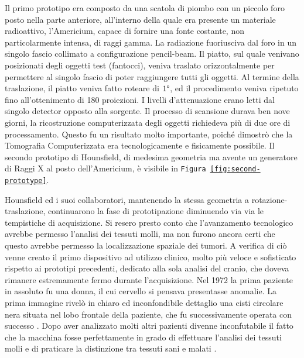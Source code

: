 \documentclass[a4paper,12pt, doubleside]{report}
\begin{document}
                    Il primo prototipo era composto da una scatola di piombo con un piccolo foro posto nella parte anteriore, all’interno della quale era presente un materiale radioattivo, l’Americium, capace di fornire una fonte costante, non particolarmente intensa, di raggi gamma. La radiazione fuoriusciva dal foro in un singolo fascio collimato a configurazione pencil-beam. Il piatto, sul quale venivano posizionati degli oggetti test (fantocci), veniva traslato orizzontalmente per permettere al singolo fascio di poter raggiungere tutti gli oggetti. Al termine della traslazione, il piatto veniva fatto roteare di $1\degree$, ed il procedimento veniva ripetuto fino all'ottenimento di 180 proiezioni. I livelli d'attenuazione erano letti dal singolo detector opposto alla sorgente. Il processo di scansione durava ben nove giorni, la ricostruzione computerizzata degli oggetti richiedeva più di due ore di processamento. Questo fu un risultato molto importante, poiché dimostrò che la Tomografia Computerizzata era tecnologicamente e fisicamente possibile. Il secondo prototipo di Hounsfield, di medesima geometria ma avente un generatore di Raggi X al posto dell'Americium, è visibile in \texttt{Figura \ref{fig:second-prototype}}.
                
                \bigskip
                \par
                    Hounsfield ed i suoi collaboratori, mantenendo la stessa geometria a rotazione-traslazione, continuarono la fase di prototipazione diminuendo via via le tempistiche di acquisizione. Si resero presto conto che l'avanzamento tecnologico avrebbe permesso l'analisi dei tessuti molli, ma non furono ancora certi che questo avrebbe permesso la localizzazione spaziale dei tumori. A verifica di ciò venne creato il primo dispositivo ad utilizzo clinico, molto più veloce e sofisticato rispetto ai prototipi precedenti, dedicato alla sola analisi del cranio, che doveva rimanere estremamente fermo durante l'acquisizione. Nel 1972 la prima paziente in assoluto fu una donna, il cui cervello si pensava presentasse anomalie. La prima immagine rivelò in chiaro ed inconfondibile dettaglio una cisti circolare nera situata nel lobo frontale della paziente, che fu successivamente operata con successo \cite{scanner-story}. Dopo aver analizzato molti altri pazienti divenne inconfutabile il fatto che la macchina fosse perfettamente in grado di effettuare l'analisi dei tessuti molli e di praticare la distinzione tra tessuti sani e malati \cite{hounsfield-nobel-lecture}.
                    
\end{document}
